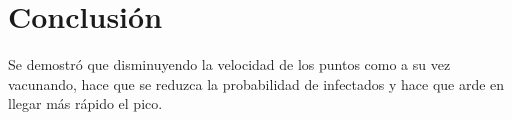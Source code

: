 \documentclass{article}
\begin{document}
\newpage
 \section{Conclusión}

Se demostró que disminuyendo la velocidad de los puntos como a su vez vacunando, hace que se reduzca la probabilidad de infectados y hace que arde en llegar más rápido el pico.

 
 

 
\end{document}

